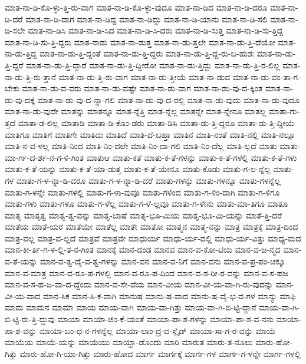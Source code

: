 {ಮಾತ-ನಾ-ಡಿ-ಕೊ-ಳ್ಳು-ತ್ತಿ-ರು-ವಾಗ
ಮಾತ-ನಾ-ಡಿ-ಕೊ-ಳ್ಳು-ವುದೂ
ಮಾತ-ನಾ-ಡಿದ
ಮಾತ-ನಾ-ಡಿ-ದರೂ
ಮಾತ-ನಾ-ಡಿ-ದರೆ
ಮಾತ-ನಾ-ಡಿ-ದಾಗ
ಮಾತ-ನಾ-ಡಿದ್ದ
ಮಾತ-ನಾ-ಡಿದ್ದು
ಮಾತ-ನಾ-ಡಿ-ಯಾನು
ಮಾತ-ನಾ-ಡಿ-ಸಲಿ
ಮಾತ-ನಾ-ಡಿ-ಸಲೇ
ಮಾತ-ನಾ-ಡಿಸಿ
ಮಾತ-ನಾ-ಡಿ-ಸಿದ
ಮಾತ-ನಾ-ಡಿ-ಸಿ-ದರು
ಮಾತ-ನಾ-ಡಿ-ಸುತ್ತ
ಮಾತ-ನಾ-ಡಿ-ಸು-ತ್ತಿದ್ದ
ಮಾತ-ನಾ-ಡಿ-ಸು-ತ್ತಿ-ದ್ದರು
ಮಾತ-ನಾಡು
ಮಾತ-ನಾ-ಡುತ್ತ
ಮಾತ-ನಾ-ಡು-ತ್ತಲೇ
ಮಾತ-ನಾ-ಡು-ತ್ತಿ-ದೆಯೋ
ಮಾತ-ನಾ-ಡು-ತ್ತಿದ್ದ
ಮಾತ-ನಾ-ಡು-ತ್ತಿ-ದ್ದಂತೆ
ಮಾತ-ನಾ-ಡು-ತ್ತಿ-ದ್ದರು
ಮಾತ-ನಾ-ಡು-ತ್ತಿ-ದ್ದ-ರು-ಬ-ಹುಶಃ
ಮಾತ-ನಾ-ಡು-ತ್ತಿ-ದ್ದರೆ
ಮಾತ-ನಾ-ಡು-ತ್ತಿ-ದ್ದಾರೆ
ಮಾತ-ನಾ-ಡು-ತ್ತಿ-ದ್ದೀರೋ
ಮಾತ-ನಾ-ಡು-ತ್ತಿದ್ದು
ಮಾತ-ನಾ-ಡು-ತ್ತಿ-ರ-ಲಿಲ್ಲ
ಮಾತ-ನಾ-ಡು-ತ್ತಿ-ರು-ತ್ತಾನೆ
ಮಾತ-ನಾ-ಡು-ತ್ತಿ-ರು-ವಾಗ
ಮಾತ-ನಾ-ಡು-ತ್ತೀಯೆ
ಮಾತ-ನಾ-ಡುವ
ಮಾತ-ನಾ-ಡು-ವಂ-ತಾ-ಗ-ಬೇಕು
ಮಾತ-ನಾ-ಡು-ವ-ವರು
ಮಾತ-ನಾ-ಡು-ವಷ್ಟೇ
ಮಾತ-ನಾ-ಡು-ವಾಗ
ಮಾತ-ನಾ-ಡು-ವು-ದ-ಕ್ಕಿಂತ
ಮಾತ-ನಾ-ಡು-ವು-ದಕ್ಕೆ
ಮಾತ-ನಾ-ಡು-ವು-ದ-ನ್ನಾ-ಗಲಿ
ಮಾತ-ನಾ-ಡು-ವು-ದ-ರಲ್ಲಿ
ಮಾತ-ನಾ-ಡು-ವುದು
ಮಾತ-ನಾ-ಡು-ವುದೂ
ಮಾತ-ನಾ-ಡು-ವುದೇ
ಮಾತನ್ನು
ಮಾತನ್ನೂ
ಮಾತ-ನ್ನೆತ್ತಿ
ಮಾತ-ನ್ನೆಲ್ಲ
ಮಾತನ್ನೇ
ಮಾತ-ನ್ನೇನೂ
ಮಾತಲ್ಲ
ಮಾತಾ-ಗು-ತ್ತದೆ
ಮಾತಾ-ಡ-ಲಿಲ್ಲ
ಮಾತಾಡಿ
ಮಾತಾ-ಡಿ-ಕೊಂ-ಡರು
ಮಾತಾ-ಡಿಸಿ
ಮಾತಾ-ಡು-ತ್ತಿ-ದ್ದರೂ
ಮಾತಾ-ಡು-ತ್ತಿ-ದ್ದೀಯೆ
ಮಾತಿಗೂ
ಮಾತಿಗೆ
ಮಾತಿಗೇ
ಮಾತಿದು
ಮಾತಿದೆ
ಮಾತಿ-ದೆ-ಬಹ್ತಾ
ಮಾತಿನ
ಮಾತಿ-ನಂತೆ
ಮಾತಿ-ನಲ್ಲಿ
ಮಾತಿ-ನಲ್ಲೂ
ಮಾತಿ-ನ-ವ-ಳಲ್ಲ
ಮಾತಿ-ನಿಂದ
ಮಾತಿ-ನಿಂ-ದಲೇ
ಮಾತಿ-ನಿಂ-ದಾ-ಗಲಿ
ಮಾತಿ-ನಿಂ-ದೆಲ್ಲ
ಮಾತಿ-ಲ್ಲದೆ
ಮಾತು
ಮಾತು-ಮಾ-ರ್ಗ-ದ-ರ್ಶ-ನ-ಗ-ಳಿ-ಗಿಂತ
ಮಾತುಆ
ಮಾತು-ಕತೆ
ಮಾತು-ಕ-ತೆ-ಗಳನ್ನು
ಮಾತು-ಕ-ತೆ-ಗಳಲ್ಲಿ
ಮಾತು-ಕ-ತೆ-ಗಳು
ಮಾತು-ಕ-ತೆ-ಯನ್ನು
ಮಾತು-ಕ-ತೆ-ಯಾ-ಡುತ್ತ
ಮಾತು-ಕ-ತೆ-ಯೇನೂ
ಮಾತು-ಕೊಡು
ಮಾತು-ಗ-ಲ-ನ್ನೆಲ್ಲ
ಮಾತು-ಗಳ
ಮಾತು-ಗ-ಳ-ನ್ನಾ-ಡಿ-ದರೂ
ಮಾತು-ಗ-ಳ-ನ್ನಾ-ಡಿ-ದರೆ
ಮಾತು-ಗಳನ್ನು
ಮಾತು-ಗಳನ್ನೂ
ಮಾತು-ಗಳನ್ನೆಲ್ಲ
ಮಾತು-ಗ-ಳನ್ನೇ
ಮಾತು-ಗಳಲ್ಲಿ
ಮಾತು-ಗ-ಳಾ-ವುವೂ
ಮಾತು-ಗಳಿಂದ
ಮಾತು-ಗ-ಳಿಂ-ದಾಗಿ
ಮಾತು-ಗ-ಳಿಗೂ
ಮಾತು-ಗಳು
ಮಾತು-ಗಳೂ
ಮಾತು-ಗ-ಳೆಲ್ಲ
ಮಾತು-ಗ-ಳೆ-ಲ್ಲವೂ
ಮಾತು-ಗ-ಳೇನು
ಮಾತು-ಮಾ-ತಿಗೂ
ಮಾತೂ
ಮಾತೃ
ಮಾತೃತ್ವ
ಮಾತೃ-ತ್ವ-ವನ್ನು
ಮಾತೃ-ಬಾಷೆ
ಮಾತೃ-ಭೂ-ಮಿಯ
ಮಾತೃ-ಭೂ-ಮಿ-ಯನ್ನು
ಮಾತೆ-ತ್ತಿ-ದರೆ
ಮಾತೆಯ
ಮಾತೆ-ಯರ
ಮಾತೆಯೇ
ಮಾತೆಲ್ಲ
ಮಾತೇ
ಮಾತೋ
ಮಾತ್ಮನ
ಮಾತ್ಮ-ನನ್ನು
ಮಾತ್ರ
ಮಾತ್ರಕ್ಕೆ
ಮಾತ್ರ-ದಿಂದ
ಮಾತ್ರ-ವಲ್ಲ
ಮಾತ್ರ-ವ-ಲ್ಲದೆ
ಮಾತ್ರವೆ
ಮಾತ್ರವೇ
ಮಾಧುರ್ಯ
ಮಾಧು-ರ್ಯ-ದಲ್ಲಿ
ಮಾಧು-ರ್ಯ-ವಿತ್ತು
ಮಾಧ್ಯ-ಮದ
ಮಾನ-ಕೀ-ರ್ತಿ-ಗ-ಳ-ಲ್ಲಿ-ತ-ನ-ಗಿಂತ
ಮಾನಕ್ಕೆ
ಮಾನ-ದಂಡ
ಮಾನವ
ಮಾನ-ವ-ಕೋ-ಟಿಯ
ಮಾನ-ವ-ಜ-ನ್ಮದ
ಮಾನ-ವ-ತೆ-ಯನ್ನು
ಮಾನ-ವ-ತ್ವ-ದೈ-ವ-ತ್ವ-ಗಳನ್ನು
ಮಾನ-ವನ
ಮಾನ-ವ-ನಿಗೆ
ಮಾನ-ವನು
ಮಾನ-ವ-ಪ್ರ-ಪಂ-ಚಕ್ಕೂ
ಮಾನ-ವ-ಮಾತ್ರ
ಮಾನ-ವ-ರೂ-ಪ-ಗಳಲ್ಲಿ
ಮಾನ-ವ-ರೂ-ಪ-ದಿಂದ
ಮಾನ-ವ-ಶ-ರೀ-ರ-ವನ್ನು
ಮಾನ-ವ-ಸ-ಹಜ
ಮಾನ-ವ-ಸ-ಹ-ಜ-ವಾ-ದ-ದ್ದೆಂದು
ಮಾನ-ವ-ಸೇ-ವೆಯ
ಮಾನ-ವೀಯ
ಮಾನ-ವೀ-ಯ-ವಾ-ಗಿ-ರು-ವುದನ್ನು
ಮಾನ-ವೀ-ಯ-ವಾದ
ಮಾನ-ಸಿಕ
ಮಾನ-ಸಿ-ಕ-ವಾಗಿ
ಮಾನುಷ
ಮಾನು-ಷ-ವಾದ
ಮಾನು-ಷ-ವೈ-ಭ-ವ-ಗಳ
ಮಾನ್ಯು
ಮಾಫಿ
ಮಾಮ
ಮಾಮನ
ಮಾಮಾ
ಮಾಯ
ಮಾಯ-ವಾಗಿ
ಮಾಯ-ವಾ-ಗಿತ್ತು
ಮಾಯ-ವಾ-ಗಿ-ಬಿ-ಟ್ಟಿ-ದ್ದಾನೆ
ಮಾಯ-ವಾ-ಗಿ-ಬಿ-ಟ್ಟಿ-ರು-ತ್ತಿ-ದ್ದುವು
ಮಾಯಾ
ಮಾಯಾ-ಜಿಂ-ಕೆ-ಯಂತೆ
ಮಾಯಾ-ಪಾ-ಶ-ಗಳನ್ನು
ಮಾಯಾ-ಪಾ-ಶ-ವ-ನನು
ಮಾಯಾ-ಪಾ-ಶ-ವನ್ನು
ಮಾಯಾ-ಬಂ-ಧ-ನ-ಗಳನ್ನೆಲ್ಲ
ಮಾಯಾ-ಲಾಂ-ದ್ರ-ದ-ಸ್ಲೈಡ್
ಮಾಯಾ-ಸಾ-ಗ-ರ-ವನ್ನು
ಮಾಯೆ
ಮಾಯೆಯ
ಮಾಯೆ-ಯನ್ನು
ಮಾಯೆಯು
ಮಾಯ್ಹಾ-ಡೊಂದು
ಮಾರಿ
ಮಾರುತ
ಮಾರು-ತ-ನೊಲು
ಮಾರು-ಹೋ-ಗಿತ್ತು
ಮಾರು-ಹೋ-ಗಿ-ಯಾ-ಗಿತ್ತು
ಮಾರು-ಹೋದ
ಮಾರ್ಗ
ಮಾರ್ಗಕ್ಕೆ
ಮಾರ್ಗ-ಗಳ
ಮಾರ್ಗ-ಗ-ಳನ್ನೇ
ಮಾರ್ಗ-ಗಳಲ್ಲಿ
}
